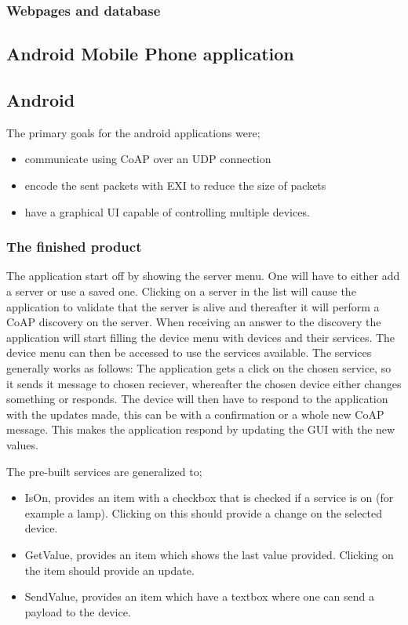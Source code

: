 \subsubsection{Webpages and database}
\subsection{Android Mobile Phone application}

\subsection{Android}

The primary goals for the android applications were;
\begin{itemize}
 \item communicate using CoAP over an UDP connection
 \item encode the sent packets with EXI to reduce the size of packets
 \item have a graphical UI capable of controlling multiple devices.
\end{itemize}

\subsubsection{The finished product}

The application start off by showing the server menu. One will have to either add a server or use a saved one. 
Clicking on a server in the list will cause the application to validate that the server is alive and thereafter it will perform a CoAP discovery on the server. 
When receiving an answer to the discovery the application will start filling the device menu with devices and their services. The device menu can then be accessed to use the services available.
The services generally works as follows: The application gets a click on the chosen service, so it sends it message to chosen reciever, whereafter the chosen device either changes something or responds.
The device will then have to respond to the application with the updates made, this can be with a confirmation or a whole new CoAP message. This makes the application respond by updating the GUI with the new values.

The pre-built services are generalized to; 
\begin{itemize}
 \item IsOn, provides an item with a checkbox that is checked if a service is on (for example a lamp). Clicking on this should provide a change on the selected device.
 \item GetValue, provides an item which shows the last value provided. Clicking on the item should provide an update.
 \item SendValue, provides an item which have a textbox where one can send a payload to the device. %
\end{itemize}

